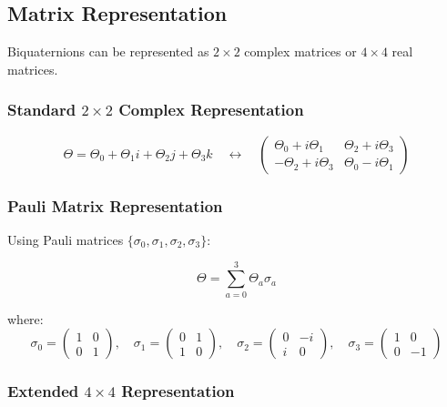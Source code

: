 \subsection{Matrix Representation}

Biquaternions can be represented as $2 \times 2$ complex matrices or $4 \times 4$ real matrices.

\subsubsection{Standard $2 \times 2$ Complex Representation}

\begin{equation}
\label{eq:canonical:biquat_2x2}
\Theta = \Theta_0 + \Theta_1 i + \Theta_2 j + \Theta_3 k \quad \leftrightarrow \quad
\begin{pmatrix}
\Theta_0 + i\Theta_1 & \Theta_2 + i\Theta_3 \\
-\Theta_2 + i\Theta_3 & \Theta_0 - i\Theta_1
\end{pmatrix}
\end{equation}

\subsubsection{Pauli Matrix Representation}

Using Pauli matrices $\{\sigma_0, \sigma_1, \sigma_2, \sigma_3\}$:

\begin{equation}
\Theta = \sum_{a=0}^{3} \Theta_a \sigma_a
\end{equation}

where:
\begin{equation}
\sigma_0 = \begin{pmatrix} 1 & 0 \\ 0 & 1 \end{pmatrix}, \quad
\sigma_1 = \begin{pmatrix} 0 & 1 \\ 1 & 0 \end{pmatrix}, \quad
\sigma_2 = \begin{pmatrix} 0 & -i \\ i & 0 \end{pmatrix}, \quad
\sigma_3 = \begin{pmatrix} 1 & 0 \\ 0 & -1 \end{pmatrix}
\end{equation}

\subsubsection{Extended $4 \times 4$ Representation}

